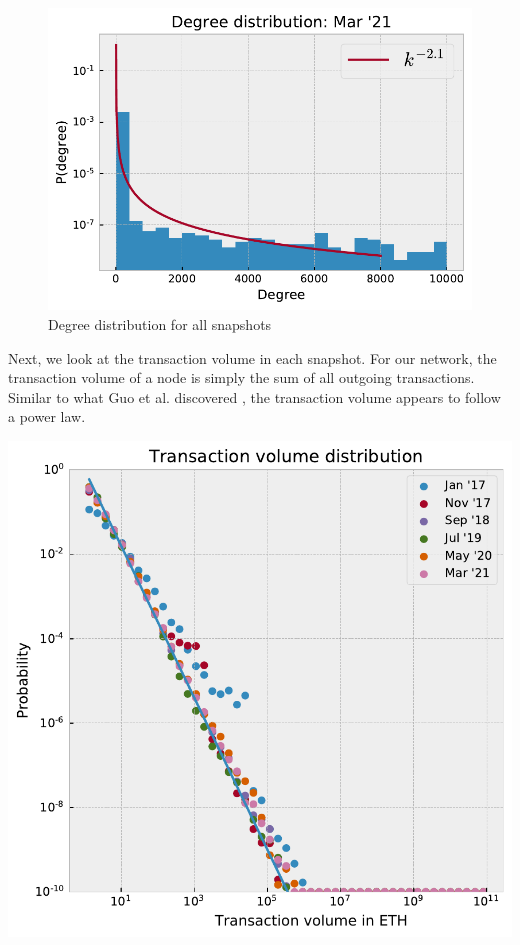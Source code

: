 \documentclass[10pt,a4paper]{article}
\newenvironment{Figure}
  {\par\medskip\noindent\minipage{\linewidth}}
  {\endminipage\par\medskip}
\begin{document}
\begin{multicols}{2}
\begin{figure}[!ht]
\begin{minipage}[t]{.33\textwidth}
\includegraphics[scale=0.4]{figures/degree_dist_mar_21.pdf}
\end{minipage}%
\caption{Degree distribution for all snapshots}
\label{tbl-degreedistributions}
\end{figure}



Next, we look at the transaction volume in each snapshot. For our network, the transaction volume of a node is simply the sum of all outgoing transactions. Similar to what Guo et al. discovered \cite{GUO201958}, the transaction volume appears to follow a power law.

\begin{Figure}
\centering
\includegraphics[scale=0.53]{figures/transaction_volume.pdf}
\end{Figure}


\end{multicols}
\end{document}
